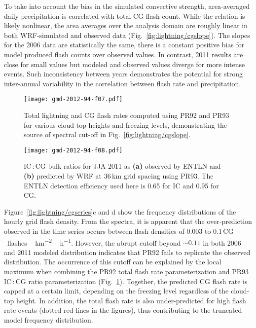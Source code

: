 To take into account the bias in the simulated convective strength,
area-averaged daily precipitation is correlated with total CG flash count.
While the relation is likely nonlinear, the area averages over the analysis
domain are roughly linear in both WRF-simulated and observed data
(Fig.~\ref{fig:lightning/cgslope}). The slopes for the 2006 data are statistically the
same, there is a constant positive bias for model produced flash counts over
observed values. In contrast, 2011 results are close for small values but
modeled and observed values diverge for more intense events. Such
inconsistency between years demonstrates the potential for strong
inter-annual variability in the correlation between flash rate and
precipitation.



\begin{figure}[t]
\texttt{[image: gmd-2012-94-f07.pdf]}
\caption[PR92-predicted total lightning as a function of cloud-top]
{Total lightning and CG flash rates computed using PR92 and PR93 for
various cloud-top heights and freezing levels, demonstrating the source of
spectral cut-off in Fig.~\ref{fig:lightning/cgslope}.} \label{fig:lightning/pr9293}
\end{figure}

\begin{figure}[t]
\texttt{[image: gmd-2012-94-f08.pdf]}
\caption[ENTLN and predicted IC:CG bulk ratios]{IC\,:\,CG bulk ratios for JJA 2011 as \textbf{(a)} observed by
 ENTLN and \textbf{(b)} predicted by WRF at 36\,\unit{km} grid spacing
 using PR93. The ENTLN detection efficiency used here is
 0.65 for IC and 0.95 for CG. }
 \label{fig:lightning/iccgmap}
\end{figure}






Figure~\ref{fig:lightning/cgseries}c and d show the frequency
distributions of the hourly grid flash density. From the spectra, it is
apparent that the over-prediction observed in the time series occurs between
flash densities of 0.003 to 0.1\,\unit{CG\,flashes\,km^{-2}\,h^{-1}}.
However, the abrupt cutoff beyond $\sim0.11$ in both 2006 and 2011 modeled
distribution indicates that PR92 fails to replicate the observed
distribution. The occurrence of this cutoff can be explained by the local
maximum when combining the PR92 total flash rate parameterization and PR93
IC\,:\,CG ratio parameterization (Fig.~\ref{fig:lightning/pr9293}). Together, the
predicted CG flash rate is capped at a certain limit, depending on the
freezing level regardless of the cloud-top height. In addition, the total
flash rate is also under-predicted for high flash rate events (dotted red
lines in the figures), thus contributing to the truncated model frequency
distribution.

